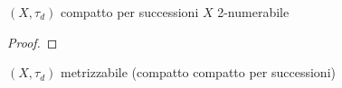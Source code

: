 \begin{prop}
$(X,\tau _d)$ compatto per successioni \implies $X$ 2-numerabile
\end{prop}
\begin{proof}
\end{proof}

\begin{cor}
$(X,\tau _d)$ metrizzabile \implies (compatto \iff compatto per successioni)
\end{cor}
